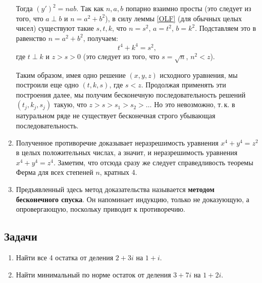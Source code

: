 \begin{enumerate}
Тогда $(y')^2=nab$. Так как $n,a,b$ попарно взаимно просты (это следует из того, что $a\perp b$ и $n=a^2+b^2$), в силу леммы \ref{OLF} (для обычных целых чисел) существуют такие $s,t,k$, что $n=s^2$, $a=t^2$, $b=k^2$. Подставляем это в равенство $n=a^2+b^2$, получаем:
$$
t^4+k^4=s^2,
$$
где $t\perp k$ и $z>s>0$ (это следует из того, что $s=\sqrt n$, $n^2<z$). 

Таким образом, имея одно решение $(x,y,z)$ исходного уравнения, мы построили еще одно $(t,k,s)$, где $s<z$. Продолжая применять эти построения далее, мы получим бесконечную последовательность решений $(t_j,k_j,s_j)$ такую, что $z>s>s_1>s_2>\dots$ Но это невозможно, т.\,к. в натуральном ряде не существует бесконечная строго убывающая последовательность.

\item Полученное противоречие доказывает неразрешимость уравнения $x^4+y^4=z^2$ в целых положительных числах, а значит, и неразрешимость уравнения $x^4+y^4=z^4$. Заметим, что отсюда сразу же следует справедливость теоремы Ферма для всех степеней $n$, кратных 4.

\item Предъявленный здесь метод доказательства называется \textbf{методом бесконечного спуска}. Он напоминает индукцию, только не доказующую, а опровергающую, поскольку приводит к противоречию.

\end{enumerate}



\subsection*{Задачи}
\begin{enumerate}
\item Найти все 4 остатка от деления $2+3i$ на $1+i$.
\item Найти минимальный по норме остаток от деления $3+7i$ на $1+2i$.
\end{enumerate}

\label{linalg}


